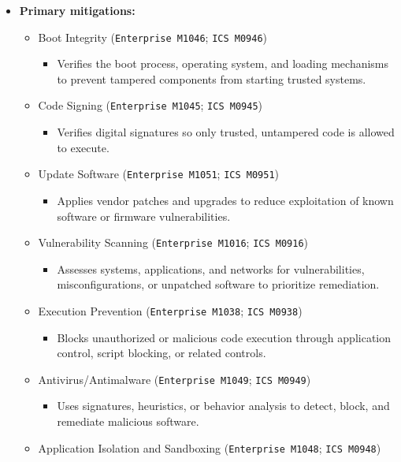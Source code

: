 \documentclass[10pt,a4paper,oneside]{report}
\begin{document}
\begin{itemize}
\item \textbf{Primary mitigations:}
\begin{itemize}
\item Boot Integrity (\texttt{Enterprise M1046}; \texttt{ICS M0946})
\begin{itemize}
\item Verifies the boot process, operating system, and loading mechanisms to prevent tampered components from starting trusted systems.
\end{itemize}
\item Code Signing (\texttt{Enterprise M1045}; \texttt{ICS M0945})
\begin{itemize}
\item Verifies digital signatures so only trusted, untampered code is allowed to execute.
\end{itemize}
\item Update Software (\texttt{Enterprise M1051}; \texttt{ICS M0951})
\begin{itemize}
\item Applies vendor patches and upgrades to reduce exploitation of known software or firmware vulnerabilities.
\end{itemize}
\item Vulnerability Scanning (\texttt{Enterprise M1016}; \texttt{ICS M0916})
\begin{itemize}
\item Assesses systems, applications, and networks for vulnerabilities, misconfigurations, or unpatched software to prioritize remediation.
\end{itemize}
\item Execution Prevention (\texttt{Enterprise M1038}; \texttt{ICS M0938})
\begin{itemize}
\item Blocks unauthorized or malicious code execution through application control, script blocking, or related controls.
\end{itemize}
\item Antivirus/Antimalware (\texttt{Enterprise M1049}; \texttt{ICS M0949})
\begin{itemize}
\item Uses signatures, heuristics, or behavior analysis to detect, block, and remediate malicious software.
\end{itemize}
\item Application Isolation and Sandboxing (\texttt{Enterprise M1048}; \texttt{ICS M0948})

\end{itemize}
\end{itemize}
\end{document}
